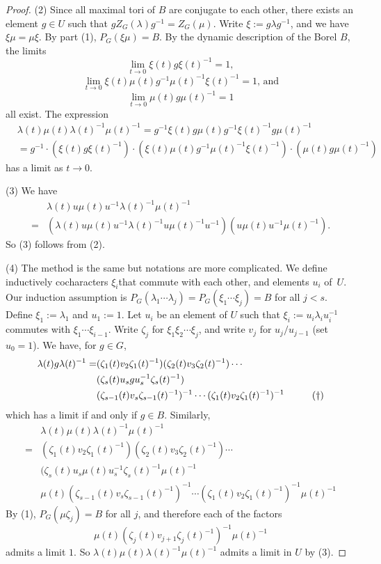 \documentclass[10pt,a4paper,twoside]{article}
\begin{document}
\begin{proof}
(2)
Since all maximal tori of $B$ are conjugate to each other,
there exists an element $g\in U$ such that
$g Z_G(\lambda)g^{-1} = Z_G(\mu)$.
Write $\xi:=g \lambda g^{-1}$, and we have
$\xi \mu = \mu \xi$.
By part (1), $P_G(\xi\mu) = B$.
By the dynamic description of the Borel $B$, the limits
$$\lim_{t\to 0}\xi(t)g \xi(t)^{-1} = 1,$$
$$\lim_{t\to 0}\xi(t)\mu(t)g^{-1} \mu(t)^{-1}\xi(t)^{-1} = 1\text{, and}$$
$$\lim_{t\to 0}\mu(t)g \mu(t)^{-1}=1$$ all exist.
The expression
\begin{align*}
&\lambda(t)\mu(t)\lambda(t)^{-1}\mu(t)^{-1}
=
g^{-1}\xi(t) g \mu(t) g^{-1} \xi(t)^{-1} g \mu(t)^{-1} \\
&=
g^{-1}\cdot (\xi(t) g \xi(t)^{-1}) \cdot (\xi(t) \mu(t) g^{-1} \mu(t)^{-1}\xi(t)^{-1})
\cdot (\mu(t) g \mu(t)^{-1})
\end{align*}
has a limit as $t\to 0$.

(3)
We have
\begin{align*}
&\lambda(t)u \mu(t) u^{-1}\lambda(t)^{-1}\mu(t)^{-1}
 \\=&
(\lambda(t)u \mu(t) u^{-1}\lambda(t)^{-1} u\mu(t)^{-1} u^{-1}) (u \mu(t) u^{-1} \mu(t)^{-1}).
\end{align*}
So (3) follows from (2).

(4)
The method is the same but notations are more complicated.
We define inductively cocharacters $\xi_i$that commute with each other, and elements $u_i$ of~$U$.
Our induction assumption is $P_G(\lambda_1 \cdots \lambda_{j})=P_G(\xi_1\cdots\xi_{j})=B$ for all $j < s$.
Define $\xi_1:=\lambda_1$ and $u_1:=1$.
Let $u_i$ be an element of $U$
such that $\xi_i:=u_i\lambda_iu_i^{-1}$
commutes with $\xi_1\cdots\xi_{i-1}$.
Write $\zeta_j$ for $\xi_1 \xi_2 \cdots\xi
_j$, and write $v_j$ for $u_j/u_{j-1}$
(set $u_0=1$).
We have, for $g\in G$,
\begin{align*}
  \lambda(t) g \lambda(t)^{-1} 
= &(\zeta_1(t) v_2 \zeta_1(t)^{-1})
(\zeta_2(t) v_3 \zeta_2(t)^{-1})\cdots \\
& (\zeta_s(t)u_sgu_s^{-1}\zeta_s(t)^{-1})\\
&(\zeta_{s-1}(t) v_s \zeta_{s-1}(t)^{-1})^{-1}\cdots
(\zeta_1(t) v_2 \zeta_1(t)^{-1})^{-1}
\hspace{10mm}
\text{($\dagger$)}
\end{align*}
which has a limit if and only if $g\in B$.
Similarly, 
\begin{align*}
  &\lambda(t) \mu(t) \lambda(t)^{-1}\mu(t)^{-1} 
\\=& (\zeta_1(t) v_2 \zeta_1(t)^{-1})
(\zeta_2(t) v_3 \zeta_2(t)^{-1})\cdots \\
& (\zeta_s(t)u_s \mu(t) u_s^{-1}\zeta_s(t)^{-1} \mu(t)^{-1}\\
&\mu(t)(\zeta_{s-1}(t) v_s \zeta_{s-1}(t)^{-1})^{-1}\cdots
(\zeta_1(t) v_2 \zeta_1(t)^{-1})^{-1} \mu(t)^{-1}
\end{align*}
By (1), $P_G(\mu\zeta_j)=B$ for all $j$,
and therefore each of the factors
$$\mu(t)(\zeta_{j}(t) v_{j+1} \zeta_{j}(t)^{-1})^{-1}\mu(t)^{-1}$$ admits a limit $1$.
So $\lambda(t) \mu(t) \lambda(t)^{-1}\mu(t)^{-1}$ admits a limit in $U$
by (3).


\end{proof}
\end{document}
